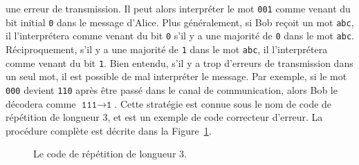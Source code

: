 une erreur de transmission. Il peut alors interpréter le mot \texttt{001} comme
venant du bit initial \texttt{0} dans le message d'Alice. Plus généralement, si
Bob reçoit un mot \texttt{abc}, il l'interprétera comme venant du bit
\texttt{0} s'il y a une majorité de \texttt{0} dans le mot \texttt{abc}.
Réciproquement, s'il y a une majorité de \texttt{1} dans le mot
\texttt{abc}, il l'interprétera comme venant du bit \texttt{1}. Bien entendu,
s'il y a trop d'erreurs de transmission dans un seul mot, il est possible de mal
interpréter le message. Par exemple, si le mot \texttt{000} devient
\texttt{110} après être passé dans le canal de communication, alors Bob
le décodera comme $\texttt{111}\to\texttt{1}$. Cette stratégie est connue sous
le nom de code de répétition de longueur $3$, et est un exemple de code
correcteur d'erreur. La procédure complète est décrite dans la
Figure~\ref{fig:rep3}.
\begin{figure}[h]
  \centering
  \caption{Le code de répétition de longueur $3$.}
  \label{fig:rep3}
\end{figure}
